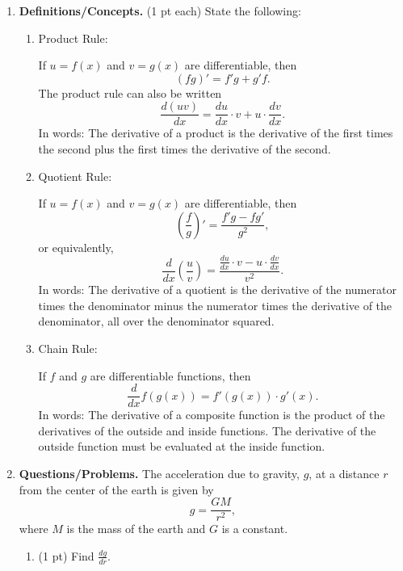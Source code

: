 \documentclass[11pt,letterpaper]{article}
\begin{document}
\begin{enumerate}
\item  \textbf{Definitions/Concepts.} (1 pt each)  State the following:
\begin{enumerate}
 \item Product Rule: 

\vspace{.5pc}
If $u=f(x)$ and $v=g(x)$ are differentiable, then
\[(fg)'=f'g+g'f.\]
The product rule can also be written 
\[\frac{d(uv)}{dx}=\frac{du}{dx}\cdot v+u\cdot \frac{dv}{dx}.\]
In words: 
\linebreak
The derivative of a product is the derivative of the first times the second plus the first times the derivative of the second.

\vspace{.5pc}
 \item Quotient Rule:

\vspace{.5pc}
If $u=f(x)$ and $v=g(x)$ are differentiable, then
\[\left(\frac{f}{g}\right) '=\frac{f'g-fg'}{g^2},\]
or equivalently,
\[\frac{d}{dx}\left(\frac{u}{v}\right)=\frac{\frac{du}{dx}\cdot v-u\cdot \frac{dv}{dx}}{v^2}.\]
In words:
\linebreak
The derivative of a quotient is the derivative of the numerator times the denominator minus the numerator times the derivative of the denominator, all over the denominator squared.

\vspace{.5pc}
 \item Chain Rule:

\vspace{.5pc}
If $f$ and $g$ are differentiable functions, then
\[\frac{d}{dx}f\left(g(x)\right)=f'\left(g(x)\right)\cdot g'(x).\]
In words:
\linebreak
The derivative of a composite function is the product of the derivatives of the outside and inside functions.  The derivative of the outside function must be evaluated at the inside function.

\end{enumerate}

\vspace{1pc}
\item \textbf{Questions/Problems.}  The acceleration due to gravity, $g$, at a
distance $r$ from the center of the earth is given by
\[g=\frac{GM}{r^2},\]
where $M$ is the mass of the earth and $G$ is a constant.

\begin{enumerate}
\item (1 pt) Find $\frac{dg}{dr}$.


\end{enumerate}
\end{enumerate}
\end{document}
